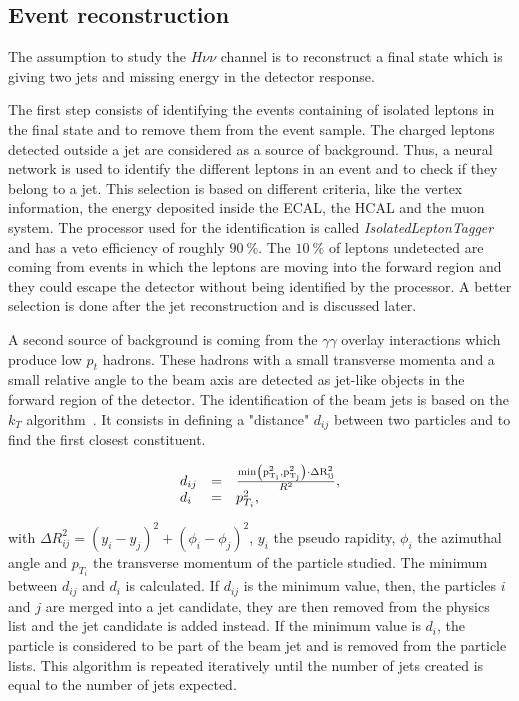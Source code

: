     \subsection{Event reconstruction}

    The assumption to study the $H \nu\nu$ channel is to reconstruct a final state which is giving two jets and missing energy in the detector response.

    The first step consists of identifying the events containing of isolated leptons in the final state and to remove them from the event sample.
    The charged leptons detected outside a jet are considered as a source of background.
    Thus, a neural network is used to identify the different leptons in an event and to check if they belong to a jet.
    This selection is based on different criteria, like the vertex information, the energy deposited inside the \gls{ECAL}, the \gls{HCAL} and the muon system. 
    The processor used for the identification is called \textit{IsolatedLeptonTagger} and has a veto efficiency of roughly $90~\%$.
    The $10~\%$ of leptons undetected are coming from events in which the leptons are moving into the forward region and they could escape the detector without being identified by the processor.
    A better selection is done after the jet reconstruction and is discussed later.

    A second source of background is coming from the $\gamma \gamma$ overlay interactions which produce low $p_{t}$ hadrons.
    These hadrons with a small transverse momenta and a small relative angle to the beam axis are detected as jet-like objects in the forward region of the detector.
    The identification of the beam jets is based on the $k_{T}$ algorithm~\cite{Cacciari2008}.
    It consists in defining a "distance" $d_{ij}$ between two particles and to find the first closest constituent.
    
    \begin{equation}
      \begin{array}{lcl}
        d_{ij} & = & \frac{\rm{min}\left(p^2_{T_i}, p^2_{T_j}\right) \cdot \Delta R^2_{ij}}{R^2}, \\
        d_{i}  & = & p^2_{T_i},
      \end{array}
    \end{equation}

    with $\Delta R^2_{ij} = \left( y_{i} - y_{j}\right)^2 + \left( \phi_{i} - \phi_{j}\right)^2$, $y_{i}$ the pseudo rapidity, $\phi_{i}$ the azimuthal angle and $p_{T_i}$ the transverse momentum of the particle studied.
    The minimum between $d_{ij}$ and $d_{i}$ is calculated.
    If $d_{ij}$ is the minimum value, then, the particles $i$ and $j$ are merged into a jet candidate, they are then removed from the physics list and the jet candidate is added instead.
    If the minimum value is $d_{i}$, the particle is considered to be part of the beam jet and is removed from the particle lists.
    This algorithm is repeated iteratively until the number of jets created is equal to the number of jets expected.
   
